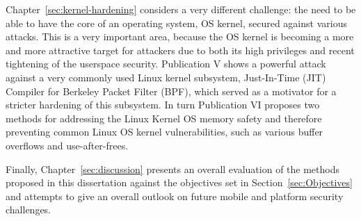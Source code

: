 Chapter~\ref{sec:kernel-hardening} considers a very different challenge: the need to be able to have the core of an operating system, OS kernel, secured against various attacks. This is a very important area, because the OS kernel is becoming a more and more attractive target for attackers due to both its high privileges and recent tightening of the userspace security. Publication V shows a powerful attack against a very commonly used Linux kernel subsystem, Just-In-Time (JIT) Compiler for Berkeley Packet Filter (BPF), which served as a motivator for a stricter hardening of this subsystem. In turn Publication VI proposes two methods for addressing the Linux Kernel OS memory safety and therefore preventing common Linux OS kernel vulnerabilities, such as various buffer overflows and use-after-frees. 

Finally, Chapter~\ref{sec:discussion} presents an overall evaluation of the methods proposed in this dissertation against the objectives set in Section~\ref{sec:Objectives} and attempts to give an overall outlook on future mobile and platform security challenges. 

